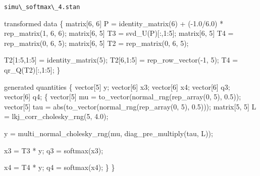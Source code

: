 \documentclass[
  letterpaper,
  DIV=11,
  numbers=noendperiod]{scrartcl}
\newenvironment{Shaded}{\begin{snugshade}}{\end{snugshade}}
\newcommand{\DataTypeTok}[1]{\textcolor[rgb]{0.68,0.00,0.00}{#1}}
\newcommand{\DecValTok}[1]{\textcolor[rgb]{0.68,0.00,0.00}{#1}}
\newcommand{\FloatTok}[1]{\textcolor[rgb]{0.68,0.00,0.00}{#1}}
\newcommand{\KeywordTok}[1]{\textcolor[rgb]{0.00,0.23,0.31}{#1}}
\newcommand{\NormalTok}[1]{\textcolor[rgb]{0.00,0.23,0.31}{#1}}
\begin{document}
\begin{codelisting}

\caption{\texttt{simu\textbackslash\_softmax\textbackslash\_4.stan}}

\begin{Shaded}
\begin{Highlighting}[]
\KeywordTok{transformed data}\NormalTok{ \{}
  \DataTypeTok{matrix}\NormalTok{[}\DecValTok{6}\NormalTok{, }\DecValTok{6}\NormalTok{] P = identity\_matrix(}\DecValTok{6}\NormalTok{) + ({-}}\FloatTok{1.0}\NormalTok{/}\FloatTok{6.0}\NormalTok{) * rep\_matrix(}\DecValTok{1}\NormalTok{, }\DecValTok{6}\NormalTok{, }\DecValTok{6}\NormalTok{);}
  \DataTypeTok{matrix}\NormalTok{[}\DecValTok{6}\NormalTok{, }\DecValTok{5}\NormalTok{] T3 = svd\_U(P)[:,}\DecValTok{1}\NormalTok{:}\DecValTok{5}\NormalTok{];}
  \DataTypeTok{matrix}\NormalTok{[}\DecValTok{6}\NormalTok{, }\DecValTok{5}\NormalTok{] T4 = rep\_matrix(}\DecValTok{0}\NormalTok{, }\DecValTok{6}\NormalTok{, }\DecValTok{5}\NormalTok{);}
  \DataTypeTok{matrix}\NormalTok{[}\DecValTok{6}\NormalTok{, }\DecValTok{5}\NormalTok{] T2 = rep\_matrix(}\DecValTok{0}\NormalTok{, }\DecValTok{6}\NormalTok{, }\DecValTok{5}\NormalTok{);}

\NormalTok{  T2[}\DecValTok{1}\NormalTok{:}\DecValTok{5}\NormalTok{,}\DecValTok{1}\NormalTok{:}\DecValTok{5}\NormalTok{] = identity\_matrix(}\DecValTok{5}\NormalTok{);}
\NormalTok{  T2[}\DecValTok{6}\NormalTok{,}\DecValTok{1}\NormalTok{:}\DecValTok{5}\NormalTok{] = rep\_row\_vector({-}}\DecValTok{1}\NormalTok{, }\DecValTok{5}\NormalTok{);}
\NormalTok{  T4 = qr\_Q(T2)[:,}\DecValTok{1}\NormalTok{:}\DecValTok{5}\NormalTok{];}
\NormalTok{\}}

\KeywordTok{generated quantities}\NormalTok{ \{}
  \DataTypeTok{vector}\NormalTok{[}\DecValTok{5}\NormalTok{] y;}
  \DataTypeTok{vector}\NormalTok{[}\DecValTok{6}\NormalTok{] x3;}
  \DataTypeTok{vector}\NormalTok{[}\DecValTok{6}\NormalTok{] x4;}
  \DataTypeTok{vector}\NormalTok{[}\DecValTok{6}\NormalTok{] q3;}
  \DataTypeTok{vector}\NormalTok{[}\DecValTok{6}\NormalTok{] q4;}
\NormalTok{  \{}
    \DataTypeTok{vector}\NormalTok{[}\DecValTok{5}\NormalTok{] mu = to\_vector(normal\_rng(rep\_array(}\DecValTok{0}\NormalTok{, }\DecValTok{5}\NormalTok{), }\FloatTok{0.5}\NormalTok{));}
    \DataTypeTok{vector}\NormalTok{[}\DecValTok{5}\NormalTok{] tau = abs(to\_vector(normal\_rng(rep\_array(}\DecValTok{0}\NormalTok{, }\DecValTok{5}\NormalTok{), }\FloatTok{0.5}\NormalTok{)));}
    \DataTypeTok{matrix}\NormalTok{[}\DecValTok{5}\NormalTok{, }\DecValTok{5}\NormalTok{] L = lkj\_corr\_cholesky\_rng(}\DecValTok{5}\NormalTok{, }\FloatTok{4.0}\NormalTok{);}

\NormalTok{    y = multi\_normal\_cholesky\_rng(mu, diag\_pre\_multiply(tau, L));}

\NormalTok{    x3 = T3 * y;}
\NormalTok{    q3 = softmax(x3);}

\NormalTok{    x4 = T4 * y;}
\NormalTok{    q4 = softmax(x4);}
\NormalTok{  \}}
\NormalTok{\}}

\end{Highlighting}
\end{Shaded}

\end{codelisting}
\end{document}
